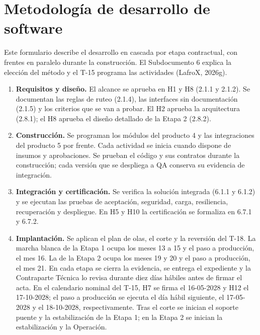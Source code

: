 \documentclass[carta,firma,final]{lafrox}
\begin{document}
\portadalafrox
\preliminareslafrox

\renewcommand{\thetable}{T-10.\arabic{table}}
\renewcommand{\thefigure}{T-10.\arabic{figure}}
\renewcommand{\thesection}{\arabic{section}}

\chapter{Metodología de desarrollo de software}

Este formulario describe el desarrollo en cascada por etapa contractual, con frentes en paralelo durante la construcción. El Subdocumento 6 explica la elección del método y el T-15 programa las actividades (LafroX, 2026g).

\begin{enumerate}
    \item \textbf{Requisitos y diseño.} El alcance se aprueba en H1 y H8 (2.1.1 y 2.1.2). Se documentan las reglas de ruteo (2.1.4), las interfaces sin documentación (2.1.5) y los criterios que se van a probar. El H2 aprueba la arquitectura (2.8.1); el H8 aprueba el diseño detallado de la Etapa 2 (2.8.2).
    \item \textbf{Construcción.} Se programan los módulos del producto 4 y las integraciones del producto 5 por frente. Cada actividad se inicia cuando dispone de insumos y aprobaciones. Se prueban el código y sus contratos durante la construcción; cada versión que se despliega a QA conserva su evidencia de integración.
    \item \textbf{Integración y certificación.} Se verifica la solución integrada (6.1.1 y 6.1.2) y se ejecutan las pruebas de aceptación, seguridad, carga, resiliencia, recuperación y despliegue. En H5 y H10 la certificación se formaliza en 6.7.1 y 6.7.2.
    \item \textbf{Implantación.} Se aplican el plan de olas, el corte y la reversión del T-18. La marcha blanca de la Etapa 1 ocupa los meses 13 a 15 y el paso a producción, el mes 16. La de la Etapa 2 ocupa los meses 19 y 20 y el paso a producción, el mes 21. En cada etapa se cierra la evidencia, se entrega el expediente y la Contraparte Técnica lo revisa durante diez días hábiles antes de firmar el acta. En el calendario nominal del T-15, H7 se firma el 16-05-2028 y H12 el 17-10-2028; el paso a producción se ejecuta el día hábil siguiente, el 17-05-2028 y el 18-10-2028, respectivamente. Tras el corte se inician el soporte puente y la estabilización de la Etapa 1; en la Etapa 2 se inician la estabilización y la Operación.
\end{enumerate}
\end{document}
